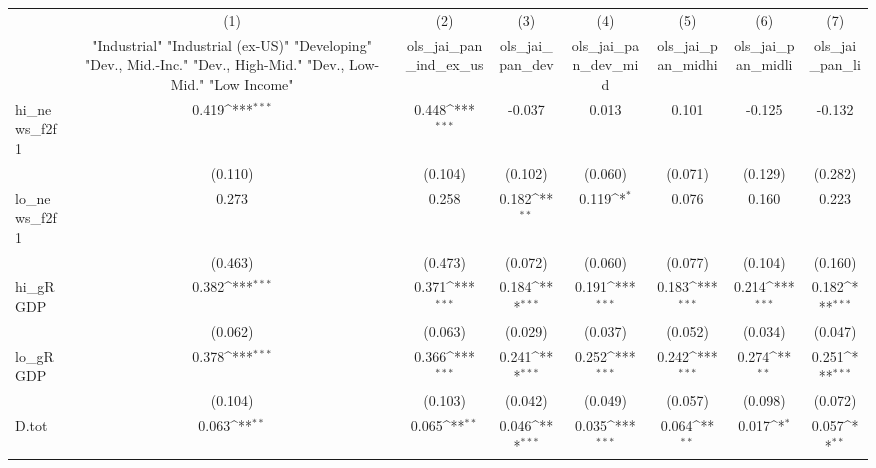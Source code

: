 {
\def\sym#1{\ifmmode^{#1}\else\(^{#1}\)\fi}
\begin{tabular}{l*{7}{c}}
\toprule
            &\multicolumn{1}{c}{(1)}&\multicolumn{1}{c}{(2)}&\multicolumn{1}{c}{(3)}&\multicolumn{1}{c}{(4)}&\multicolumn{1}{c}{(5)}&\multicolumn{1}{c}{(6)}&\multicolumn{1}{c}{(7)}\\
            &\multicolumn{1}{c}{ "Industrial" "Industrial (ex-US)" "Developing" "Dev., Mid.-Inc." "Dev., High-Mid."  "Dev., Low-Mid." "Low Income" }&\multicolumn{1}{c}{ols\_jai\_pan\_ind\_ex\_us}&\multicolumn{1}{c}{ols\_jai\_pan\_dev}&\multicolumn{1}{c}{ols\_jai\_pan\_dev\_mid}&\multicolumn{1}{c}{ols\_jai\_pan\_midhi}&\multicolumn{1}{c}{ols\_jai\_pan\_midli}&\multicolumn{1}{c}{ols\_jai\_pan\_li}\\
\midrule
hi\_news\_f2f1&       0.419\sym{***}&       0.448\sym{***}&      -0.037         &       0.013         &       0.101         &      -0.125         &      -0.132         \\
            &     (0.110)         &     (0.104)         &     (0.102)         &     (0.060)         &     (0.071)         &     (0.129)         &     (0.282)         \\
\addlinespace
lo\_news\_f2f1&       0.273         &       0.258         &       0.182\sym{**} &       0.119\sym{*}  &       0.076         &       0.160         &       0.223         \\
            &     (0.463)         &     (0.473)         &     (0.072)         &     (0.060)         &     (0.077)         &     (0.104)         &     (0.160)         \\
\addlinespace
hi\_gRGDP    &       0.382\sym{***}&       0.371\sym{***}&       0.184\sym{***}&       0.191\sym{***}&       0.183\sym{***}&       0.214\sym{***}&       0.182\sym{***}\\
            &     (0.062)         &     (0.063)         &     (0.029)         &     (0.037)         &     (0.052)         &     (0.034)         &     (0.047)         \\
\addlinespace
lo\_gRGDP    &       0.378\sym{***}&       0.366\sym{***}&       0.241\sym{***}&       0.252\sym{***}&       0.242\sym{***}&       0.274\sym{**} &       0.251\sym{***}\\
            &     (0.104)         &     (0.103)         &     (0.042)         &     (0.049)         &     (0.057)         &     (0.098)         &     (0.072)         \\
\addlinespace
D.tot       &       0.063\sym{**} &       0.065\sym{**} &       0.046\sym{***}&       0.035\sym{***}&       0.064\sym{**} &       0.017\sym{*}  &       0.057\sym{**} \\

\end{tabular}}
